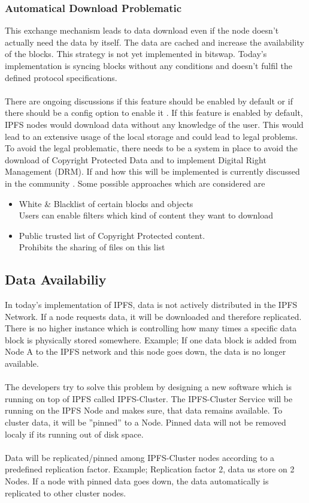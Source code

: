 \documentclass[a4paper,11pt, oneside]{report}
\theoremstyle{definition}
\begin{document}
\subsubsection{Automatical Download Problematic}
This exchange mechanism leads to data download even if the node doesn't actually need the data by itself. The data are cached and increase the availability of the blocks. This strategy is not yet implemented in bitswap. Today's implementation is syncing blocks without any conditions and doesn't fulfil the defined protocol specifications.\\ \\ 
There are ongoing discussions if this feature should be enabled by default or if there should be a config option to enable it \cite{bitswapstrategy}. If this feature is enabled by default, IPFS nodes would download data without any knowledge of the user. This would lead to an extensive usage of the local storage and could lead to legal problems. To avoid the legal problematic, there needs to be a system in place to avoid the download of Copyright Protected Data and to implement Digital Right Management (DRM). If and how this will be implemented is currently discussed in the community \cite{copyright}. Some possible approaches which are considered are 
\begin{itemize}
\item White \& Blacklist of certain blocks and objects\\ Users can enable filters which kind of content they want to download
\item Public trusted list of Copyright Protected content. \\ Prohibits the sharing of files on this list
\end{itemize}


\subsection{Data Availabiliy}
In today's implementation of IPFS, data is not actively distributed in the IPFS Network. If a node requests data, it will be downloaded and therefore replicated. There is no higher instance which is controlling how many times a specific data block is physically stored somewhere. Example; If one data block is added from Node A to the IPFS network and this node goes down, the data is no longer available.\\ \\ The developers try to solve this problem by designing a new software which is running on top of IPFS called IPFS-Cluster. The IPFS-Cluster Service will be running on the IPFS Node and makes sure, that data remains available. To cluster data, it will be ''pinned'' to a Node. Pinned data will not be removed localy if its running out of disk space. \\ \\
Data will be replicated/pinned among IPFS-Cluster nodes according to a predefined replication factor. Example; Replication factor 2, data us store on 2 Nodes. If a node with pinned data goes down, the data automatically is replicated to other cluster nodes.
\end{document}
